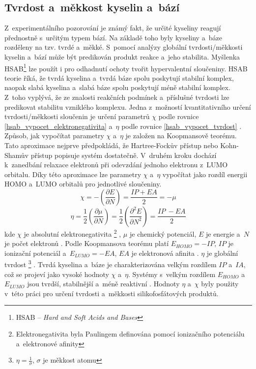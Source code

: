 \documentclass[
digital, %
table,   %
nolof,     %
nolot,     %
oneside,
]{fithesis3}
\begin{document}
\subsection{Tvrdost a~měkkost kyselin a~bází}
Z~experimentálního pozorování je známý fakt, že určité kyseliny reagují přednostně s~určitým typem bází. Na základě toho byly kyseliny a~báze rozděleny na tzv. tvrdé a~měkké. S~pomocí analýzy globální tvrdosti/měkkosti kyselin a~bází může být predikován produkt reakce a~jeho stabilita. Myšlenka HSAB\footnote{HSAB -- \textit{Hard and Soft Acids and Bases}} lze použít i pro odhadnutí ochoty tvořit hypervalentní sloučeniny. HSAB teorie říká, že tvrdá kyselina a~tvrdá báze spolu poskytují stabilní komplex, naopak slabá kyselina a~slabá báze spolu poskytují méně stabilní komplex. Z~toho vyplývá, že ze znalosti reakčních podmínek a~příslušné tvrdosti lze predikovat stabilitu vzniklého komplexu. Jedna z~možností kvantitativního určení tvrdosti/měkkosti sloučenin je určení parametrů $\chi$ podle rovnice \ref{hsab_vypocet_elektronegativita} a~$\eta$ podle rovnice \ref{hsab_vypocet_tvrdost} \cite{hsabclanek}. Způsob, jak vypočítat parametry $\chi$ a~$\eta$ je založen na Koopmansově teorému. Tato aproximace nejprve předpokládá, že Hartree-Fockův přístup nebo Kohn-Shamův přístup popisuje systém dostatečně. V~druhém kroku dochází k~zanedbání relaxace elektronů při odevzdání jednoho elektronu z~LUMO orbitalu. Díky této aproximace lze parametry $\chi$ a~$\eta$ vypočítat jako rozdíl energii HOMO a~LUMO orbitalů pro jednotlivé sloučeniny.
\begin{equation}
\chi = - \left( \frac{\partial E}{\partial N} \right) = \frac{IP + EA}{2} = -\mu
\label{hsab_vypocet_elektronegativita}
\end{equation}
\begin{equation}
\eta = \frac{1}{2} \left( \frac{\partial \mu}{\partial N} \right) = \frac{1}{2}\left( \frac{\partial^2 E}{\partial N^2} \right) = \frac{IP~- EA}{2}
\label{hsab_vypocet_tvrdost}
\end{equation}
kde $\chi$ je absolutní elektronegativita  \footnote{Elektronegativita byla Paulingem definována pomocí ionizačního potenciálu a~elektronové afinity} , $\mu$ je chemický potenciál, $E$ je energie a~$N$ je počet elektronů \cite{hsabwatoc}. Podle Koopmansova teorému platí $E_{HOMO} = - IP$, $IP$ je ionizační potenciál a~$E_{LUMO} = -EA$, $EA$ je elektronová afinita \cite{kratochvilexcerpta}. $\eta$ je globální tvrdost \footnote{$\eta = \frac{1}{\sigma}$, $\sigma$ je měkkost atomu} \cite{pearson1986absolute}. Tvrdá kyselina a~báze je charakterizována velkým rozdílem $IP$ a~$IA$, což se projeví jako vysoké hodnoty $\chi$ a~$\eta$. Systémy s~velkým rozdílem $E_{HOMO}$ a~$E_{LUMO}$ jsou tvrdší, stabilnější a~méně reaktivní \cite{hsabwatoc}. Hodnoty $\eta$ a~$\chi$ byly použity v~této práci pro určení tvrdosti a~měkkosti silikofosfátových produktů.\\
\end{document}
